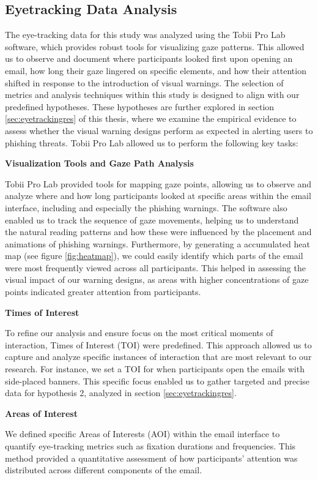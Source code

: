 \documentclass[
  a4paper,  %
  twoside,  %
  bibliography=totoc,
  headsepline,
  cleardoublepage=empty,
  parskip=half,
  draft=false
]{scrbook}
\begin{document}
\subsection{Eyetracking Data Analysis} 
The eye-tracking data for this study was analyzed using the Tobii Pro Lab software, which provides robust tools for visualizing gaze patterns. This allowed us to observe and document where participants looked first upon opening an email, how long their gaze lingered on specific elements, and how their attention shifted in response to the introduction of visual warnings. 
The selection of metrics and analysis techniques within this study is designed to align with our predefined hypotheses. These hypotheses are further explored in section \ref{sec:eyetrackingres} of this thesis, where we examine the empirical evidence to assess whether the visual warning designs perform as expected in alerting users to phishing threats. Tobii Pro Lab allowed us to perform the following key tasks:

\textbf{Visualization Tools and Gaze Path Analysis}

Tobii Pro Lab provided tools for mapping gaze points, allowing us to observe and analyze where and how long participants looked at specific areas within the email interface, including and especially the phishing warnings. The software also enabled us to track the sequence of gaze movements, helping us to understand the natural reading patterns and how these were influenced by the placement and animations of phishing warnings.
Furthermore, by generating a accumulated heat map (see figure \ref{fig:heatmap}), we could easily identify which parts of the email were most frequently viewed across all participants. This helped in assessing the visual impact of our warning designs, as areas with higher concentrations of gaze points indicated greater attention from participants.

\textbf{Times of Interest}

To refine our analysis and ensure focus on the most critical moments of interaction, Times of Interest (TOI) were predefined. This approach allowed us to capture and analyze specific instances of interaction that are most relevant to our research. For instance, we set a TOI for when participants open the emails with side-placed banners. This specific focus enabled us to gather targeted and precise data for hypothesis 2, analyzed in section \ref{sec:eyetrackingres}.

\textbf{Areas of Interest}

We defined specific Areas of Interests (AOI) within the email interface to quantify eye-tracking metrics such as fixation durations and frequencies. This method provided a quantitative assessment of how participants' attention was distributed across different components of the email. 
\end{document}

